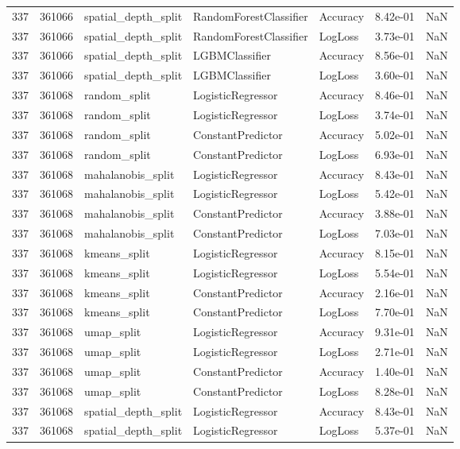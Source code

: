 \begin{tabular}{rrlllrr}
337 & 361066 & spatial\_depth\_split & RandomForestClassifier & Accuracy & 8.42e-01 & NaN \\
337 & 361066 & spatial\_depth\_split & RandomForestClassifier & LogLoss & 3.73e-01 & NaN \\
337 & 361066 & spatial\_depth\_split & LGBMClassifier & Accuracy & 8.56e-01 & NaN \\
337 & 361066 & spatial\_depth\_split & LGBMClassifier & LogLoss & 3.60e-01 & NaN \\
337 & 361068 & random\_split & LogisticRegressor & Accuracy & 8.46e-01 & NaN \\
337 & 361068 & random\_split & LogisticRegressor & LogLoss & 3.74e-01 & NaN \\
337 & 361068 & random\_split & ConstantPredictor & Accuracy & 5.02e-01 & NaN \\
337 & 361068 & random\_split & ConstantPredictor & LogLoss & 6.93e-01 & NaN \\
337 & 361068 & mahalanobis\_split & LogisticRegressor & Accuracy & 8.43e-01 & NaN \\
337 & 361068 & mahalanobis\_split & LogisticRegressor & LogLoss & 5.42e-01 & NaN \\
337 & 361068 & mahalanobis\_split & ConstantPredictor & Accuracy & 3.88e-01 & NaN \\
337 & 361068 & mahalanobis\_split & ConstantPredictor & LogLoss & 7.03e-01 & NaN \\
337 & 361068 & kmeans\_split & LogisticRegressor & Accuracy & 8.15e-01 & NaN \\
337 & 361068 & kmeans\_split & LogisticRegressor & LogLoss & 5.54e-01 & NaN \\
337 & 361068 & kmeans\_split & ConstantPredictor & Accuracy & 2.16e-01 & NaN \\
337 & 361068 & kmeans\_split & ConstantPredictor & LogLoss & 7.70e-01 & NaN \\
337 & 361068 & umap\_split & LogisticRegressor & Accuracy & 9.31e-01 & NaN \\
337 & 361068 & umap\_split & LogisticRegressor & LogLoss & 2.71e-01 & NaN \\
337 & 361068 & umap\_split & ConstantPredictor & Accuracy & 1.40e-01 & NaN \\
337 & 361068 & umap\_split & ConstantPredictor & LogLoss & 8.28e-01 & NaN \\
337 & 361068 & spatial\_depth\_split & LogisticRegressor & Accuracy & 8.43e-01 & NaN \\
337 & 361068 & spatial\_depth\_split & LogisticRegressor & LogLoss & 5.37e-01 & NaN \\

\end{tabular}
